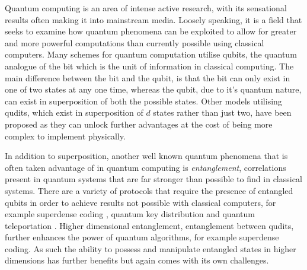 Quantum computing is an area of intense active research, with its sensational results often making it into mainstream media.
Loosely speaking, it is a field that seeks to examine how quantum phenomena can be exploited to allow for greater and more powerful computations than currently possible using classical computers.
Many schemes for quantum computation utilise qubits, the quantum analogue of the bit which is the unit of information in classical computing.
The main difference between the bit and the qubit, is that the bit can only exist in one of two states at any one time, whereas the qubit, due to it's quantum nature, can exist in superposition of both the possible states.
Other models utilising qudits, which exist in superposition of $d$ states rather than just two, have been proposed as they can unlock further advantages at the cost of being more complex to implement physically.

In addition to superposition, another well known quantum phenomena that is often taken advantage of in quantum computing is \emph{entanglement}, correlations present in quantum systems that are far stronger than possible to find in classical systems.
There are a variety of protocols that require the presence of entangled qubits in order to achieve results not possible with classical computers, for example superdense coding \cite{Superdense}, quantum key distribution \cite{qkd} and quantum teleportation \cite{qteleport}.
Higher dimensional entanglement, entanglement between qudits, further enhances the power of quantum algorithms, for example superdense coding.
As such the ability to possess and manipulate entangled states in higher dimensions has further benefits but again comes with its own challenges. \newline

